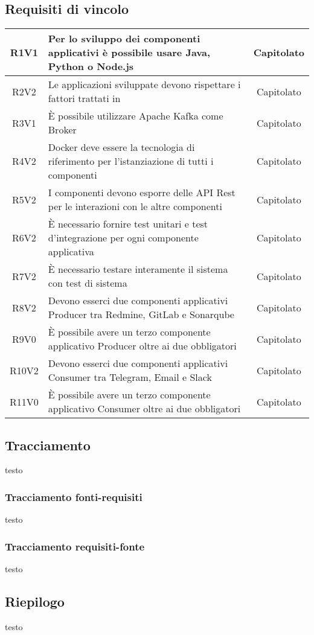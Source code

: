 	\subsection{Requisiti di vincolo}
		\begin{tabularx}{\textwidth}{ c X c }
			R1V1 & Per lo sviluppo dei componenti applicativi è possibile usare Java, Python o Node.js & Capitolato \\ \hline
			R2V2 & Le applicazioni sviluppate devono rispettare i fattori trattati in \gloss{The Twelve-Factor App} & Capitolato	\\ \hline
			R3V1 & È possibile utilizzare Apache Kafka come Broker & Capitolato \\ \hline
			R4V2 & Docker deve essere la tecnologia di riferimento per l'istanziazione di tutti i componenti & Capitolato \\ \hline
			R5V2 & I componenti devono esporre delle API Rest per le interazioni con le altre componenti & Capitolato \\ \hline
			R6V2 & È necessario fornire test unitari e test d'integrazione per ogni componente applicativa & Capitolato \\ \hline
			R7V2 & È necessario testare interamente il sistema con test di sistema & Capitolato \\ \hline
			R8V2 & Devono esserci due componenti applicativi Producer tra Redmine, GitLab e Sonarqube & Capitolato \\ \hline
			R9V0 & È possibile avere un terzo componente applicativo Producer oltre ai due obbligatori &  Capitolato \\ \hline
			R10V2 & Devono esserci due componenti applicativi Consumer tra Telegram, Email e Slack & Capitolato \\ \hline
			R11V0 & È possibile avere un terzo componente applicativo Consumer oltre ai due obbligatori & Capitolato \\ \hline
		\end{tabularx}
	
			
	
	\subsection{Tracciamento}
	testo
	
		\subsubsection{Tracciamento fonti-requisiti}
		testo
		
		\subsubsection{Tracciamento requisiti-fonte}
		testo
		
	\subsection{Riepilogo}
	testo